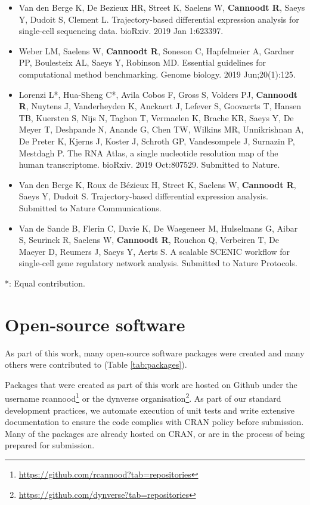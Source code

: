 \begin{itemize}
	\item Van den Berge K, De Bezieux HR, Street K, Saelens W, \textbf{Cannoodt R}, Saeys Y, Dudoit S, Clement L. Trajectory-based differential expression analysis for single-cell sequencing data. bioRxiv. 2019 Jan 1:623397.
	\item Weber LM, Saelens W, \textbf{Cannoodt R}, Soneson C, Hapfelmeier A, Gardner PP, Boulesteix AL, Saeys Y, Robinson MD. Essential guidelines for computational method benchmarking. Genome biology. 2019 Jun;20(1):125.
	\item Lorenzi L*, Hua-Sheng C*, Avila Cobos F, Gross S, Volders PJ, \textbf{Cannoodt R}, Nuytens J, Vanderheyden K, Anckaert J, Lefever S, Goovaerts T, Hansen TB, Kuersten S, Nijs N, Taghon T, Vermaelen K, Brache KR, Saeys Y, De Meyer T, Deshpande N, Anande G, Chen TW, Wilkins MR, Unnikrishnan A, De Preter K, Kjerns J, Koster J, Schroth GP, Vandesompele J, Surnazin P, Mestdagh P. The RNA Atlas, a single nucleotide resolution map of the human transcriptome. bioRxiv. 2019 Oct:807529. Submitted to Nature. 
	\item Van den Berge K, Roux de Bézieux H, Street K, Saelens W, \textbf{Cannoodt R}, Saeys Y, Dudoit S. Trajectory-based differential expression analysis. Submitted to Nature Communications.
	\item Van de Sande B, Flerin C, Davie K, De Waegeneer M, Hulselmans G, Aibar S, Seurinck R, Saelens W, \textbf{Cannoodt R}, Rouchon Q, Verbeiren T, De Maeyer D, Reumers J, Saeys Y, Aerts S. A scalable SCENIC workflow for single-cell gene regulatory network analysis. Submitted to Nature Protocols.
\end{itemize}

*: Equal contribution.

\section{Open-source software}
As part of this work, many open-source software packages were created and many others were contributed to (Table \ref{tab:packages}). 

Packages that were created as part of this work are hosted on Github under the username rcannood\footnote{\url{https://github.com/rcannood?tab=repositories}} or the dynverse organisation\footnote{\url{https://github.com/dynverse?tab=repositories}}. As part of our standard development practices, we automate execution of unit tests and write extensive documentation to ensure the code complies with CRAN policy before submission. Many of the packages are already hosted on CRAN, or are in the process of being prepared for submission.

